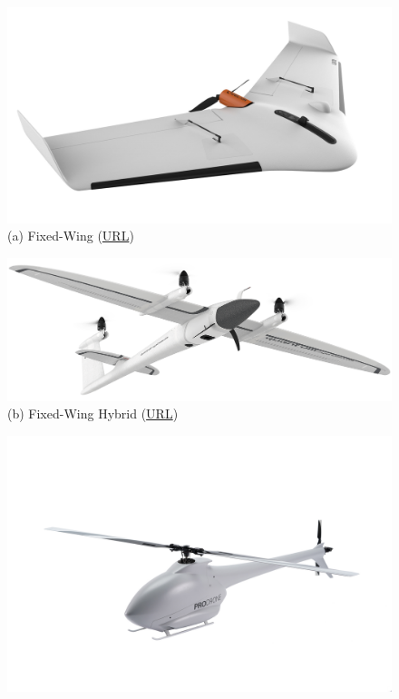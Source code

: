 \begin{figure} [H]
    \centering
    \begin{minipage}{.5\textwidth}
      \centering
      \includegraphics[width=\linewidth]{Images/Introduction/uav-fixed-wing-example.jpg}
      {(a) Fixed-Wing} (\href{https://delair.aero/portfolio/surveying-and-mapping/}{URL})
    \end{minipage}%
    \begin{minipage}{.5\textwidth}
      \centering
      \includegraphics[width=\linewidth]{Images/Introduction/uav-fixed-wing-hybrid-example.png}
      {(b) Fixed-Wing Hybrid} (\href{https://www.quantum-systems.com/project/trinity-f90/}{URL})
    \end{minipage}
    \begin{minipage}{.5\textwidth}
        \centering
        \includegraphics[width=\linewidth]{Images/Introduction/uav-single-rotor-example.jpg}

\end{minipage}
\end{figure}

